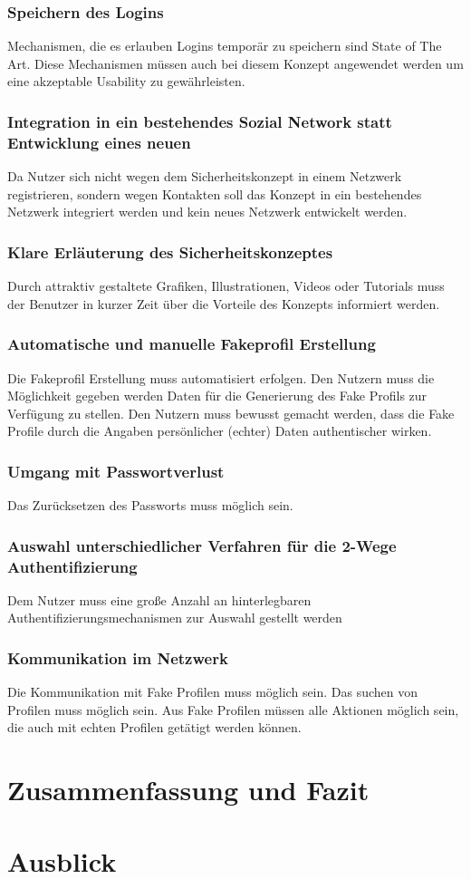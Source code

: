 \documentclass{sigchi}
\begin{document}
\subsubsection{Speichern des Logins}
Mechanismen, die es erlauben Logins temporär zu speichern sind State of The Art. Diese Mechanismen müssen auch bei diesem Konzept angewendet werden um eine akzeptable Usability zu gewährleisten.
\subsubsection{Integration in ein bestehendes Sozial Network statt Entwicklung eines neuen}
Da Nutzer sich nicht wegen dem Sicherheitskonzept in einem Netzwerk registrieren, sondern wegen Kontakten soll das Konzept in ein bestehendes Netzwerk integriert werden und kein neues Netzwerk entwickelt werden.
\subsubsection{Klare Erläuterung des Sicherheitskonzeptes}
Durch attraktiv gestaltete Grafiken, Illustrationen, Videos oder Tutorials muss der Benutzer in kurzer Zeit über die Vorteile des Konzepts informiert werden.
\subsubsection{Automatische und manuelle Fakeprofil Erstellung}
Die Fakeprofil Erstellung muss automatisiert erfolgen. Den Nutzern muss die Möglichkeit gegeben werden Daten für die Generierung des Fake Profils zur Verfügung zu stellen. Den Nutzern muss bewusst gemacht werden, dass die Fake Profile durch die Angaben persönlicher (echter) Daten authentischer wirken.
\subsubsection{Umgang mit Passwortverlust}
Das Zurücksetzen des Passworts muss möglich sein.
\subsubsection{Auswahl unterschiedlicher Verfahren für die 2-Wege Authentifizierung}
Dem Nutzer muss eine große Anzahl an hinterlegbaren Authentifizierungsmechanismen zur Auswahl gestellt werden
\subsubsection{Kommunikation im Netzwerk}
Die Kommunikation mit Fake Profilen muss möglich sein. Das suchen von Profilen muss möglich sein. Aus Fake Profilen müssen alle Aktionen möglich sein, die auch mit echten Profilen getätigt werden können.
\section{Zusammenfassung und Fazit}

\section{Ausblick}

%
%
\end{document}
